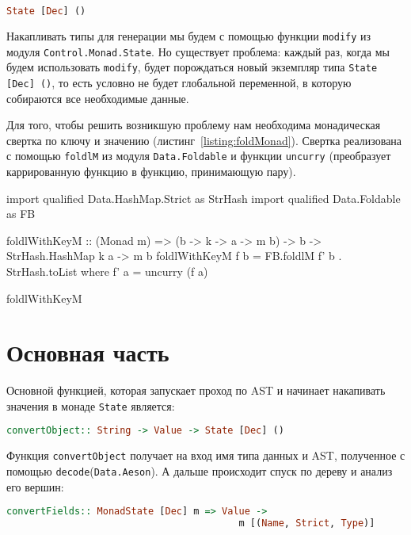 \begin{lstlisting}[language=Haskell]
State [Dec] ()
\end{lstlisting}

Накапливать типы для генерации мы будем с помощью функции \lstinline{modify} из модуля \lstinline{Control.Monad.State}. Но существует проблема: каждый раз, когда мы будем использовать \lstinline{modify}, будет порождаться новый экземпляр типа \lstinline{State [Dec] ()}, то есть условно не будет глобальной переменной, в которую собираются все необходимые данные. 

Для того, чтобы решить возникшую проблему нам необходима монадическая свертка по ключу и значению (листинг~\ref{listing:foldMonad}). Свертка реализована с помощью \lstinline{foldlM} из модуля \lstinline{Data.Foldable} и функции \lstinline{uncurry} (преобразует каррированную функцию в функцию, принимающую пару).

\begin{ListingEnv}[H]
\begin{Verb}
import qualified Data.HashMap.Strict as StrHash
import qualified Data.Foldable    as FB

foldlWithKeyM :: (Monad m) => (b -> k -> a -> m b) -> b ->
                                       StrHash.HashMap k a -> m b
foldlWithKeyM f b = FB.foldlM f' b . StrHash.toList
  where f' a = uncurry (f a)
\end{Verb}
\caption{foldlWithKeyM}
\label{listing:foldMonad}
\end{ListingEnv} 

\section{Основная часть}

Основной функцией, которая запускает проход по AST и начинает накапивать значения в монаде \lstinline{State} является: 

\begin{lstlisting}[language=Haskell]
convertObject:: String -> Value -> State [Dec] ()
\end{lstlisting}

Функция \lstinline{convertObject} получает на вход имя типа данных и AST, полученное с помощью \lstinline{decode}(\lstinline{Data.Aeson}). А дальше происходит спуск по дереву и анализ его вершин:

\begin{lstlisting}[language=Haskell]
convertFields:: MonadState [Dec] m => Value -> 
                                         m [(Name, Strict, Type)]
\end{lstlisting}

